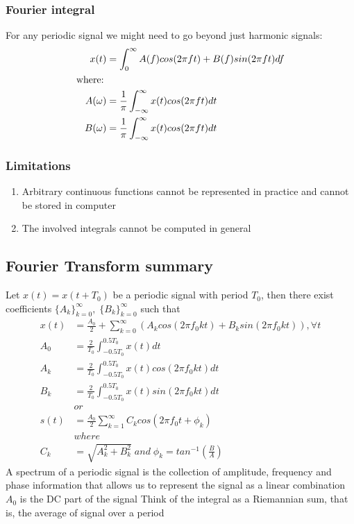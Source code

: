 \documentclass{article}
\begin{document}
    \subsubsection{Fourier integral}
    For any periodic signal we might need to go beyond just harmonic signals:
    \begin{align}
        x(t) &= \int_{0}^{\infty} A(f)cos(2\pi ft) + B(f)sin(2\pi ft)df\\
        \text{where:\;}\nonumber\\
        A(\omega) &= \frac{1}{\pi} \int_{-\infty}^{\infty} x(t)cos(2\pi ft)dt\\
        B(\omega) &= \frac{1}{\pi} \int_{-\infty}^{\infty} x(t)cos(2\pi ft)dt
    \end{align}
    \subsubsection{Limitations}
    \begin{enumerate}
        \item Arbitrary continuous functions cannot be represented in practice and cannot be stored in computer
        \item The involved integrals cannot be computed in general
    \end{enumerate}
    \subsection{Fourier Transform summary}
    Let $x(t) = x(t + T_0)$ be a periodic signal with period $T_0$, then there exist coefficients $\{A_k\}_{k = 0}^{\infty},\; \{B_k\}_{k = 0}^{\infty}$ such that
    \begin{align}
        x(t) &= \frac{A_0}{2} + \sum_{k=0}^{\infty}\left( A_k cos(2 \pi f_0 k t) + B_k sin(2 \pi f_0 k t)\right), \forall t\\
        A_0 &= \frac{2}{T_0} \int_{-0.5T_0}^{0.5T_0} x(t)dt\\
        A_k &= \frac{2}{T_0} \int_{-0.5T_0}^{0.5T_0} x(t)cos(2\pi f_0 kt)dt\\
        B_k &= \frac{2}{T_0} \int_{-0.5T_0}^{0.5T_0} x(t)sin(2\pi f_0 kt)dt\\
        &or \nonumber\\
        s(t) &= \frac{A_0}{2} \sum_{k=1}^{\infty} C_k cos(2 \pi f_0t + \phi_k)\\
        &where \nonumber\\
        C_k &= \sqrt{A_k^2 + B_k^2}\;and\;\phi_k = tan^{-1}(\frac{B}{A})
    \end{align}
    A spectrum of a periodic signal is the collection of amplitude, 
    frequency and phase information that allows us to represent the signal as a linear combination
    $A_0$ is the DC part of the signal
    Think of the integral as a Riemannian sum, that is, 
    the average of signal over a period
\end{document}
